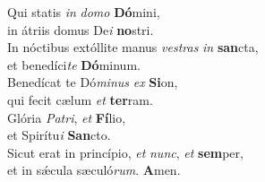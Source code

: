 \evenverse Qui statis \textit{in} \textit{do}\textit{mo} \textbf{Dó}mini,~\*\\
\evenverse in átriis domus De\textit{i} \textbf{no}stri.\\
\oddverse In nóctibus extóllite manus \textit{ve}\textit{stras} \textit{in} \textbf{san}cta,~\*\\
\oddverse et benedíci\textit{te} \textbf{Dó}minum.\\
\evenverse Benedícat te Dó\textit{mi}\textit{nus} \textit{ex} \textbf{Si}on,~\*\\
\evenverse qui fecit cælum \textit{et} \textbf{ter}ram.\\
\oddverse Glória \textit{Pa}\textit{tri}, \textit{et} \textbf{Fí}lio,~\*\\
\oddverse et Spirítu\textit{i} \textbf{San}cto.\\
\evenverse Sicut erat in princípio, \textit{et} \textit{nunc}, \textit{et} \textbf{sem}per,~\*\\
\evenverse et in sǽcula sæculó\textit{rum}. \textbf{A}men.\\
